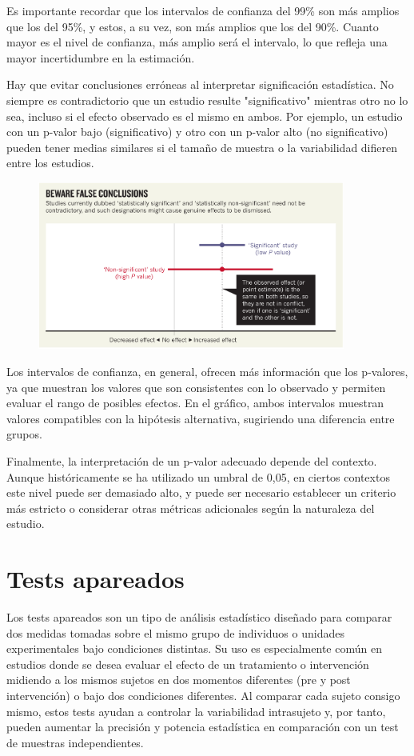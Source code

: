 \documentclass{config/apuntes}\usepackage[]{graphicx}\usepackage[]{xcolor}
\begin{document}
Es importante recordar que los intervalos de confianza del 99\% son más amplios que los del 95\%, y estos, a su vez, son más amplios que los del 90\%. Cuanto mayor es el nivel de confianza, más amplio será el intervalo, lo que refleja una mayor incertidumbre en la estimación.

Hay que evitar conclusiones erróneas al interpretar significación estadística. No siempre es contradictorio que un estudio resulte "significativo" mientras otro no lo sea, incluso si el efecto observado es el mismo en ambos. Por ejemplo, un estudio con un p-valor bajo (significativo) y otro con un p-valor alto (no significativo) pueden tener medias similares si el tamaño de muestra o la variabilidad difieren entre los estudios.

\begin{figure}[h!]
\centering
\includegraphics[width = 0.9\textwidth]{figs/amrhein.pdf}
\end{figure}

Los intervalos de confianza, en general, ofrecen más información que los p-valores, ya que muestran los valores que son consistentes con lo observado y permiten evaluar el rango de posibles efectos. En el gráfico, ambos intervalos muestran valores compatibles con la hipótesis alternativa, sugiriendo una diferencia entre grupos.

Finalmente, la interpretación de un p-valor adecuado depende del contexto. Aunque históricamente se ha utilizado un umbral de 0,05, en ciertos contextos este nivel puede ser demasiado alto, y puede ser necesario establecer un criterio más estricto o considerar otras métricas adicionales según la naturaleza del estudio.

\section{Tests apareados}
Los tests apareados son un tipo de análisis estadístico diseñado para comparar dos medidas tomadas sobre el mismo grupo de individuos o unidades experimentales bajo condiciones distintas. Su uso es especialmente común en estudios donde se desea evaluar el efecto de un tratamiento o intervención midiendo a los mismos sujetos en dos momentos diferentes (pre y post intervención) o bajo dos condiciones diferentes. Al comparar cada sujeto consigo mismo, estos tests ayudan a controlar la variabilidad intrasujeto y, por tanto, pueden aumentar la precisión y potencia estadística en comparación con un test de muestras independientes.
\end{document}
